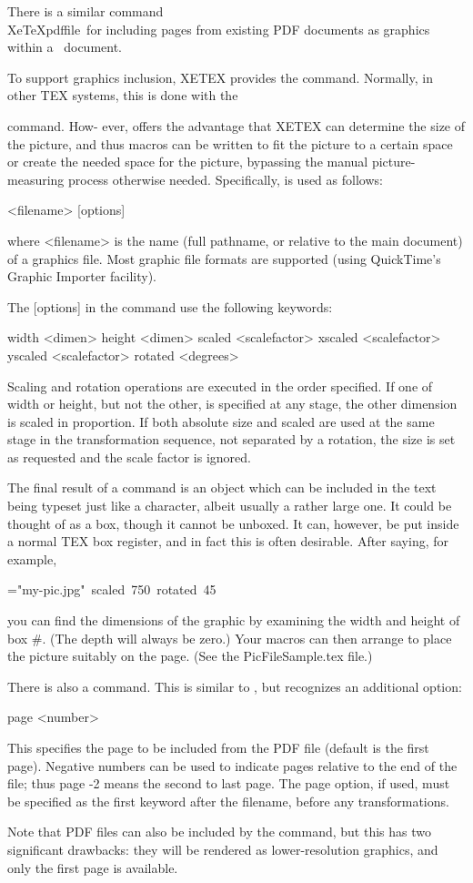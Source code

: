 There is a similar command \\XeTeXpdffile\ for including pages from
existing PDF documents as graphics within a \XeTeX\ document.

\bye


To support graphics inclusion, XETEX provides the \XeTeXpicfile command.
Normally, in other TEX systems, this is done with the \special command. How-
ever, \XeTeXpicfile offers the advantage that XETEX can determine the size of
the picture, and thus macros can be written to fit the picture to a certain space or
create the needed space for the picture, bypassing the manual picture-measuring
process otherwise needed. Specifically, \XeTeXpicfile is used as follows:

       \XeTeXpicfile <filename> [options]

where <filename> is the name (full pathname, or relative to the main document) of
a graphics file. Most graphic file formats are supported (using QuickTime's Graphic
Importer facility).

The [options] in the \XeTeXpicfile command use the following keywords:

       width <dimen>
       height <dimen>
       scaled <scalefactor>
       xscaled <scalefactor>
       yscaled <scalefactor>
       rotated <degrees>

Scaling and rotation operations are executed in the order specified. If one of width
or height, but not the other, is specified at any stage, the other dimension is scaled
in proportion. If both absolute size and scaled are used at the same stage in the
transformation sequence, not separated by a rotation, the size is set as requested
and the scale factor is ignored.

The final result of a \XeTeXpicfile command is an object which can be
included in the text being typeset just like a character, albeit usually a rather large
one. It could be thought of as a box, though it cannot be unboxed. It can, however,
be put inside a normal TEX box register, and in fact this is often desirable. After
saying, for example,

        =\hbox{\XeTeXpicfile "my-pic.jpg" scaled 750 rotated 45}

you can find the dimensions of the graphic by examining the width and height of
box #. (The depth will always be zero.) Your macros can then arrange to place the
picture suitably on the page. (See the PicFileSample.tex file.)

There is also a \XeTeXpdffile command. This is similar to \XeTeXpicfile,
but recognizes an additional option:

        page <number>

This specifies the page to be included from the PDF file (default is the first page).
Negative numbers can be used to indicate pages relative to the end of the file;
thus page -2 means the second to last page. The page option, if used, must be
specified as the first keyword after the filename, before any transformations.

Note that PDF files can also be included by the \XeTeXpicfile command,
but this has two significant drawbacks: they will be rendered as lower-resolution
graphics, and only the first page is available.

